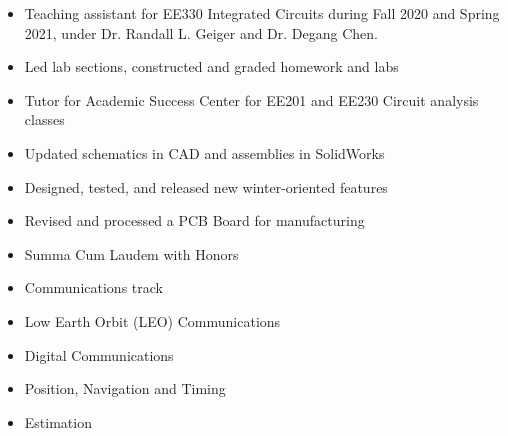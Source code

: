 \documentclass[11pt,a4paper,ragged2e,twocolumn]{altacv}
\begin{document}
\divider

\begin{itemize}
    \item Teaching assistant for EE330 Integrated Circuits during Fall 2020 and Spring 2021,
          under Dr. Randall L. Geiger and Dr. Degang Chen.
    \item Led lab sections, constructed and graded homework and labs
    \item Tutor for Academic Success Center for EE201 and EE230 Circuit analysis classes
\end{itemize}

\divider

\begin{itemize}
    \item Updated schematics in CAD and assemblies in SolidWorks
    \item Designed, tested, and released new winter-oriented features
    \item Revised and processed a PCB Board for manufacturing
\end{itemize}









\divider

\begin{itemize}
    \item Summa Cum Laudem with Honors
    \item Communications track
\end{itemize}
\nocite{*}
\printbibliography[title={Related Work}]


\begin{itemize}
    \item Low Earth Orbit (LEO) Communications
    \item Digital Communications
    \item Position, Navigation and Timing
    \item Estimation
\end{itemize}
\end{document}
